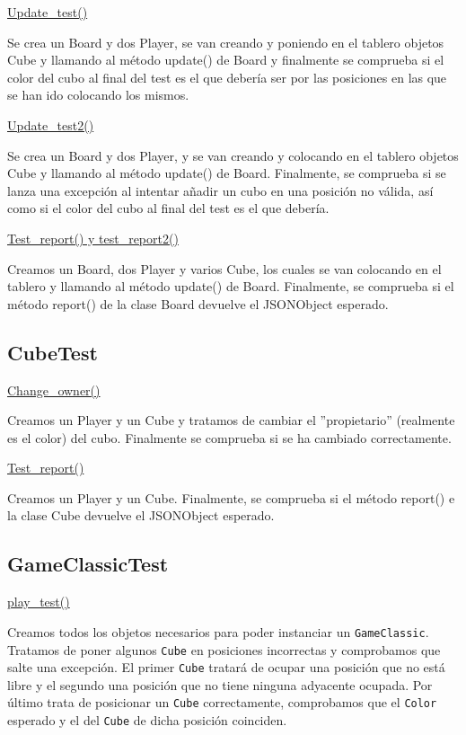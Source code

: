 \documentclass[../DocumentoOficial.tex]{subfiles}
\begin{document}
\underline{Update\_test()}

Se crea un Board y dos Player, se van creando y poniendo en el tablero objetos Cube y llamando al método update() de Board y finalmente se comprueba si el color del cubo al final del test es el que debería ser por las posiciones en las que se han ido colocando los mismos.

\underline{Update\_test2()}

Se crea un Board y dos Player, y se van creando y colocando en el tablero objetos Cube y llamando al método update() de Board. Finalmente, se comprueba si se lanza una excepción al intentar añadir un cubo en una posición no válida, así como si el color del cubo al final del test es el que debería.

\underline{Test\_report() y test\_report2()}

Creamos un Board, dos Player y varios Cube, los cuales se van colocando en el tablero y llamando al método update() de Board. Finalmente, se comprueba si el método report() de la clase Board devuelve el JSONObject esperado.

\subsection{CubeTest}
\underline{Change\_owner()}

Creamos un Player y un Cube y tratamos de cambiar el ''propietario'' (realmente es el color) del cubo. Finalmente se comprueba si se ha cambiado correctamente.

\underline{Test\_report()}

Creamos un Player y un Cube. Finalmente, se comprueba si el método report() e la clase Cube devuelve el JSONObject esperado.


\subsection{GameClassicTest}
\underline{play\_test()}

Creamos todos los objetos necesarios para poder instanciar un \texttt{GameClassic}. Tratamos de poner algunos \texttt{Cube} en posiciones incorrectas y comprobamos que salte una excepción. El primer \texttt{Cube} tratará de ocupar una posición que no está libre y el segundo una posición que no tiene ninguna adyacente ocupada. Por último trata de posicionar un \texttt{Cube} correctamente, comprobamos que el \texttt{Color} esperado y el del \texttt{Cube} de dicha posición coinciden.
\end{document}
